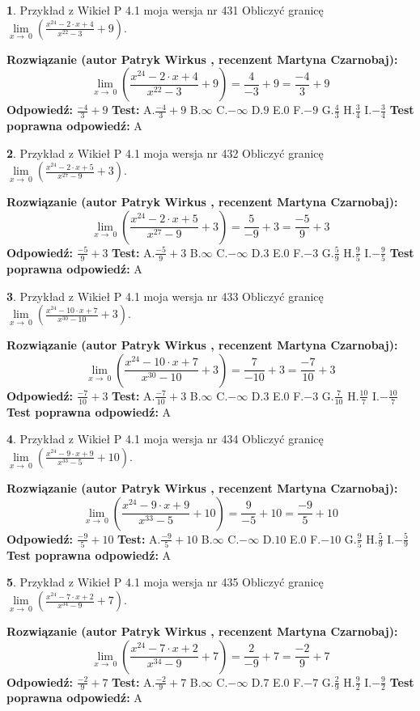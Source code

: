 \documentclass[12pt, a4paper]{article}
\theoremstyle{definition} %
\newtheorem{zad}{}
\newcommand{\zadStart}[1]{\begin{zad}#1\newline}
\newcommand{\zadStop}{\end{zad}}
\newcommand{\rozwStart}[2]{\noindent \textbf{Rozwiązanie (autor #1 , recenzent #2): }\newline}
\newcommand{\rozwStop}{\newline}
\newcommand{\odpStart}{\noindent \textbf{Odpowiedź:}\newline}
\newcommand{\odpStop}{\newline}
\newcommand{\testStart}{\noindent \textbf{Test:}\newline}
\newcommand{\testStop}{\newline}
\newcommand{\kluczStart}{\noindent \textbf{Test poprawna odpowiedź:}\newline}
\newcommand{\kluczStop}{\newline}
\begin{document}
\zadStart{Przykład z Wikieł P 4.1 moja wersja nr 431}
Obliczyć granicę $\lim\limits_{x\to\ 0}(\frac{x^{24}-2 \cdot x +4}{x^{22}-3}+9)$.
\zadStop
\rozwStart{Patryk Wirkus}{Martyna Czarnobaj}
$$\lim\limits_{x\to\ 0}(\frac{x^{24}-2 \cdot x +4}{x^{22}-3}+9)=\frac{4}{-3}+9=\frac{-4}{3}+9$$
\rozwStop
\odpStart
$\frac{-4}{3}+9$
\odpStop
\testStart
A.$\frac{-4}{3}+9$
B.$\infty$
C.$-\infty$
D.$9$
E.$0$
F.$-9$
G.$\frac{4}{3}$
H.$\frac{3}{4}$
I.$-\frac{3}{4}$
\testStop
\kluczStart
A
\kluczStop



\zadStart{Przykład z Wikieł P 4.1 moja wersja nr 432}
Obliczyć granicę $\lim\limits_{x\to\ 0}(\frac{x^{24}-2 \cdot x +5}{x^{27}-9}+3)$.
\zadStop
\rozwStart{Patryk Wirkus}{Martyna Czarnobaj}
$$\lim\limits_{x\to\ 0}(\frac{x^{24}-2 \cdot x +5}{x^{27}-9}+3)=\frac{5}{-9}+3=\frac{-5}{9}+3$$
\rozwStop
\odpStart
$\frac{-5}{9}+3$
\odpStop
\testStart
A.$\frac{-5}{9}+3$
B.$\infty$
C.$-\infty$
D.$3$
E.$0$
F.$-3$
G.$\frac{5}{9}$
H.$\frac{9}{5}$
I.$-\frac{9}{5}$
\testStop
\kluczStart
A
\kluczStop



\zadStart{Przykład z Wikieł P 4.1 moja wersja nr 433}
Obliczyć granicę $\lim\limits_{x\to\ 0}(\frac{x^{24}-10 \cdot x +7}{x^{30}-10}+3)$.
\zadStop
\rozwStart{Patryk Wirkus}{Martyna Czarnobaj}
$$\lim\limits_{x\to\ 0}(\frac{x^{24}-10 \cdot x +7}{x^{30}-10}+3)=\frac{7}{-10}+3=\frac{-7}{10}+3$$
\rozwStop
\odpStart
$\frac{-7}{10}+3$
\odpStop
\testStart
A.$\frac{-7}{10}+3$
B.$\infty$
C.$-\infty$
D.$3$
E.$0$
F.$-3$
G.$\frac{7}{10}$
H.$\frac{10}{7}$
I.$-\frac{10}{7}$
\testStop
\kluczStart
A
\kluczStop



\zadStart{Przykład z Wikieł P 4.1 moja wersja nr 434}
Obliczyć granicę $\lim\limits_{x\to\ 0}(\frac{x^{24}-9 \cdot x +9}{x^{33}-5}+10)$.
\zadStop
\rozwStart{Patryk Wirkus}{Martyna Czarnobaj}
$$\lim\limits_{x\to\ 0}(\frac{x^{24}-9 \cdot x +9}{x^{33}-5}+10)=\frac{9}{-5}+10=\frac{-9}{5}+10$$
\rozwStop
\odpStart
$\frac{-9}{5}+10$
\odpStop
\testStart
A.$\frac{-9}{5}+10$
B.$\infty$
C.$-\infty$
D.$10$
E.$0$
F.$-10$
G.$\frac{9}{5}$
H.$\frac{5}{9}$
I.$-\frac{5}{9}$
\testStop
\kluczStart
A
\kluczStop



\zadStart{Przykład z Wikieł P 4.1 moja wersja nr 435}
Obliczyć granicę $\lim\limits_{x\to\ 0}(\frac{x^{24}-7 \cdot x +2}{x^{34}-9}+7)$.
\zadStop
\rozwStart{Patryk Wirkus}{Martyna Czarnobaj}
$$\lim\limits_{x\to\ 0}(\frac{x^{24}-7 \cdot x +2}{x^{34}-9}+7)=\frac{2}{-9}+7=\frac{-2}{9}+7$$
\rozwStop
\odpStart
$\frac{-2}{9}+7$
\odpStop
\testStart
A.$\frac{-2}{9}+7$
B.$\infty$
C.$-\infty$
D.$7$
E.$0$
F.$-7$
G.$\frac{2}{9}$
H.$\frac{9}{2}$
I.$-\frac{9}{2}$
\testStop
\kluczStart
A
\kluczStop
\end{document}
